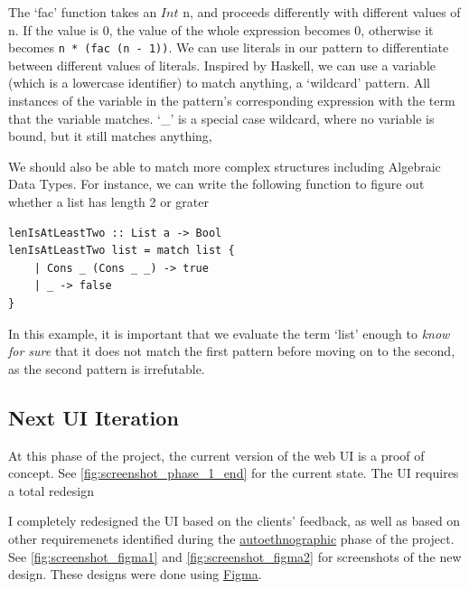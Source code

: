 The `fac' function takes an $Int$ n, and proceeds differently with different values of n. If the value is 0, the value of the whole expression becomes 0, otherwise it becomes \lstinline[language=SFL]!n * (fac (n - 1))!. We can use literals in our pattern to differentiate between different values of literals. Inspired by Haskell, we can use a variable (which is a lowercase identifier) to match anything, a `wildcard' pattern. All instances of the variable in the pattern's corresponding expression with the term that the variable matches. `\_' is a special case wildcard, where no variable is bound, but it still matches anything, 

We should also be able to match more complex structures including Algebraic Data Types. For instance, we can write the following function to figure out whether a list has length 2 or grater

\begin{lstlisting}[language=SFL]
lenIsAtLeastTwo :: List a -> Bool
lenIsAtLeastTwo list = match list {
    | Cons _ (Cons _ _) -> true
    | _ -> false
}    
\end{lstlisting}

\noindent In this example, it is important that we evaluate the term `list' enough to \textit{know for sure} that it does not match the first pattern before moving on to the second, as the second pattern is irrefutable. 

\subsection{Next UI Iteration}
\label{c2:next_ui}
At this phase of the project, the current version of the web UI is a proof of concept. See \ref{fig:screenshot_phase_1_end} for the current state. The UI requires a total redesign 

I completely redesigned the UI based on the clients' feedback, as well as based on other requiremenets identified during the \hyperref[sec:c1_autoethnography]{autoethnographic} phase of the project.  See \ref{fig:screenshot_figma1} and \ref{fig:screenshot_figma2} for screenshots of the new design. These designs were done using \href{https://figma.com}{Figma}. 


